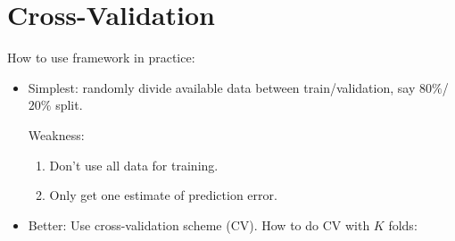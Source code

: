 \section{Cross-Validation}
How to use framework in practice:
\begin{itemize}
    \item Simplest: randomly divide available data
          between train/validation, say $ 80\% $/$ 20\% $ split.

          Weakness:
          \begin{enumerate}
              \item Don't use all data for training.
              \item Only get one estimate of prediction error.
          \end{enumerate}
    \item Better: Use cross-validation scheme (CV). How to
          do CV with $ K $ folds:
          \begin{figure}[!ht]
              \centering
\end{figure}
\end{itemize}
